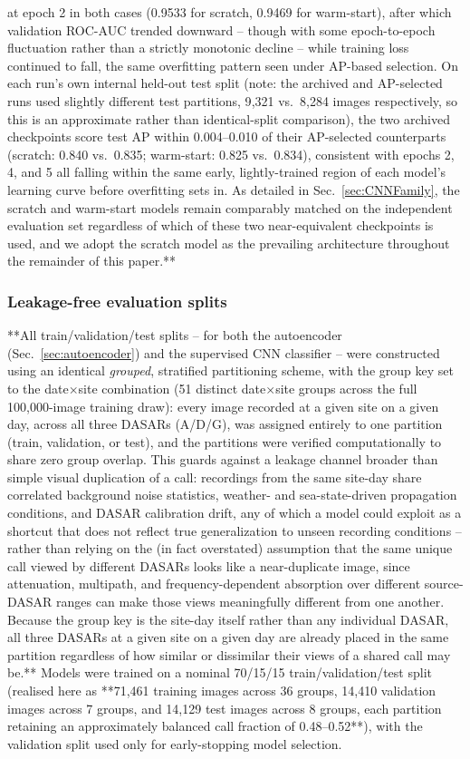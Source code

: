 \documentclass[preprint,NumberedRefs]{JASAnew}
\begin{document}
at epoch 2 in both cases (0.9533 for scratch, 0.9469 for warm-start),
after which validation ROC-AUC trended downward -- though with some
epoch-to-epoch fluctuation rather than a strictly monotonic decline --
while training loss continued to fall, the same overfitting pattern seen
under AP-based selection. On each run's own internal held-out test split
(note: the archived and AP-selected runs used slightly different test
partitions, 9{,}321 vs.\ 8{,}284 images respectively, so this is an
approximate rather than identical-split comparison), the two archived
checkpoints score test AP within 0.004--0.010 of their AP-selected
counterparts (scratch: 0.840 vs.\ 0.835; warm-start: 0.825 vs.\ 0.834),
consistent with epochs 2, 4, and 5 all falling within the same early,
lightly-trained region of each model's learning curve before overfitting
sets in. As detailed in Sec.~\ref{sec:CNNFamily}, the scratch and
warm-start models remain comparably matched on the independent evaluation
set regardless of which of these two near-equivalent checkpoints is used,
and we adopt the scratch model as the prevailing architecture throughout
the remainder of this paper.**

\subsubsection{Leakage-free evaluation splits}
**All train/validation/test splits -- for both the autoencoder
(Sec.~\ref{sec:autoencoder}) and the supervised CNN classifier -- were
constructed using an identical \emph{grouped}, stratified partitioning
scheme, with the group key set to the date$\times$site combination (51
distinct date$\times$site groups across the full 100,000-image training
draw): every image recorded at a given site on a given day, across all
three DASARs (A/D/G), was assigned entirely to one partition (train,
validation, or test), and the partitions were verified computationally to
share zero group overlap. This guards against a leakage channel broader
than simple visual duplication of a call: recordings from the same
site-day share correlated background noise statistics, weather- and
sea-state-driven propagation conditions, and DASAR calibration drift, any
of which a model could exploit as a shortcut that does not reflect true
generalization to unseen recording conditions -- rather than relying on
the (in fact overstated) assumption that the same unique call viewed by
different DASARs looks like a near-duplicate image, since attenuation,
multipath, and frequency-dependent absorption over different
source-DASAR ranges can make those views meaningfully different from one
another. Because the group key is the site-day itself rather than any
individual DASAR, all three DASARs at a given site on a given day are
already placed in the same partition regardless of how similar or
dissimilar their views of a shared call may be.** Models were trained on a
nominal 70/15/15
train/validation/test split (realised here as **71,461 training images
across 36 groups, 14,410 validation images across 7 groups, and 14,129
test images across 8 groups, each partition retaining an approximately
balanced call fraction of 0.48--0.52**), with the validation split used only
for early-stopping model selection.
\end{document}
